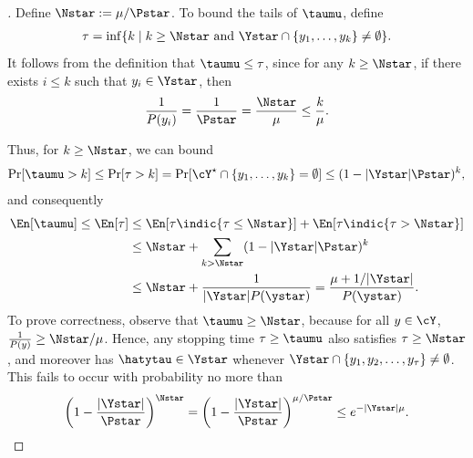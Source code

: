 \begin{proof}[] Define $\Nstar := \mu/\Pstar $.
To bound the tails of $\taumu$, define
\begin{align}
\tau = \inf \{k\mid{}k \ge \Nstar \text{ and } \Ystar \cap
  \{y_1,\dots,y_k\} \ne \emptyset\}.
  \end{align}
  It follows from the definition that $\taumu \le \tau$, since
  for any $k\geq{}\Nstar$, if there exists $i\leq{}k$ such that
  $y_i\in\Ystar$, then
  \begin{align}
    \frac{1}{P(y_i)}
    = \frac{1}{\Pstar} = \frac{\Nstar}{\mu} \leq \frac{k}{\mu}.
  \end{align}

  Thus, for $k \ge \Nstar$, we can bound
\begin{align}
    \Pr[\taumu >k] \le \Pr[\tau > k] = \Pr[\cY^{\star} \cap \{y_1,\dots,y_k\} = \emptyset]  \le (1 - |\Ystar|\Pstar)^k,
\end{align}
and consequently 
\begin{align}
    \En[\taumu] \le \En[\tau] &\le  \En[\tau \indic\{\tau \le
                               \Nstar\}] +  \En[\tau \indic\{\tau >
                               \Nstar\}]\\
                               &\le \Nstar + \sum_{k > \Nstar}  (1 -
                                 |\Ystar|\Pstar)^k \\
                             &\le \Nstar +
                                 \frac{1}{|\Ystar|P(\ystar)}
                                 = \frac{\mu+1/|\Ystar|}{P(\ystar)}.
\end{align}
To prove correctness, observe that  $\taumu \ge \Nstar$,  
because for all $y \in \cY$, $\frac{1}{P(y)} \ge \Nstar/\mu$. Hence,
any stopping time $\tau \ge \taumu$ also satisfies $\tau \ge \Nstar$,
and moreover has $\hatytau \in \Ystar$ whenever $\Ystar \cap
\{y_1,y_2,\dots,y_{\tau}\} \ne \emptyset$. This fails to occur with
probability no more than
\begin{align}
    \left(1 - \frac{|\Ystar|}{\Pstar}\right)^{\Nstar} = \left(1 - \frac{|\Ystar|}{\Pstar}\right)^{\mu/\Pstar} \le e^{-|\Ystar|\mu}.
\end{align}

\end{proof}

